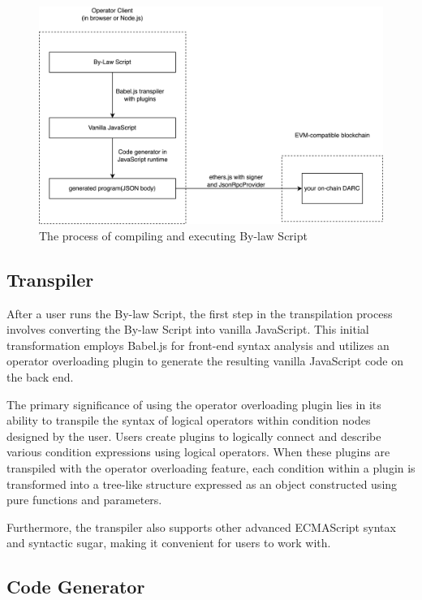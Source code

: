 \documentclass[main.tex]{subfiles}
\begin{document}
\begin{figure}
\centering
\includegraphics[width=1\linewidth]{by-law.drawio.large.png}
\caption{\label{fig:byLaw}The process of compiling and executing By-law Script}
\end{figure}


\subsection{Transpiler}

After a user runs the By-law Script, the first step in the transpilation process involves converting the By-law Script into vanilla JavaScript. This initial transformation employs Babel.js \cite{githubGitHubBabelbabel} for front-end syntax analysis and utilizes an operator overloading plugin to generate the resulting vanilla JavaScript code on the back end.

The primary significance of using the operator overloading plugin lies in its ability to transpile the syntax of logical operators within condition nodes designed by the user. Users create plugins to logically connect and describe various condition expressions using logical operators. When these plugins are transpiled with the operator overloading feature, each condition within a plugin is transformed into a tree-like structure expressed as an object constructed using pure functions and parameters.

Furthermore, the transpiler also supports other advanced ECMAScript syntax and syntactic sugar, making it convenient for users to work with.

\subsection{Code Generator}
\end{document}

